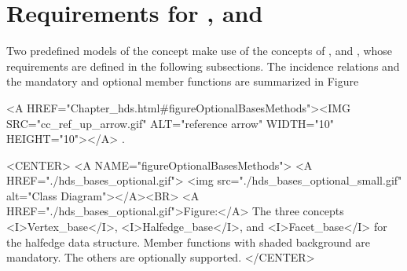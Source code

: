 \section{Requirements for \protect{},
  \protect{} and \protect{}}
\label{sectionHdsBases}

Two predefined models of the  concept
make use of the concepts of ,  and
, whose requirements are defined in the
following subsections. The incidence relations and the mandatory and
optional member functions are summarized in
Figure~\begin{ccHtmlOnly}
  <A HREF="Chapter_hds.html#figureOptionalBasesMethods"><IMG 
  SRC="cc_ref_up_arrow.gif" ALT="reference arrow" WIDTH="10" HEIGHT="10"></A>
.\end{ccHtmlOnly}

\begin{ccHtmlOnly}
    <CENTER>
    <A NAME="figureOptionalBasesMethods">
    <A HREF="./hds_bases_optional.gif">
        <img src="./hds_bases_optional_small.gif" 
             alt="Class Diagram"></A><BR>
    <A HREF="./hds_bases_optional.gif">Figure:</A>
    The three concepts <I>Vertex_base</I>, <I>Halfedge_base</I>, and 
          <I>Facet_base</I> for the halfedge data structure. Member
          functions with shaded background are mandatory. The others
          are optionally supported.
    </CENTER>
\end{ccHtmlOnly}


\def\ccTagRmConstRefPair{\ccFalse}
\def\ccTagRmEigenClassName{\ccFalse}
\def\ccTagRmTrailingConst{\ccFalse}

